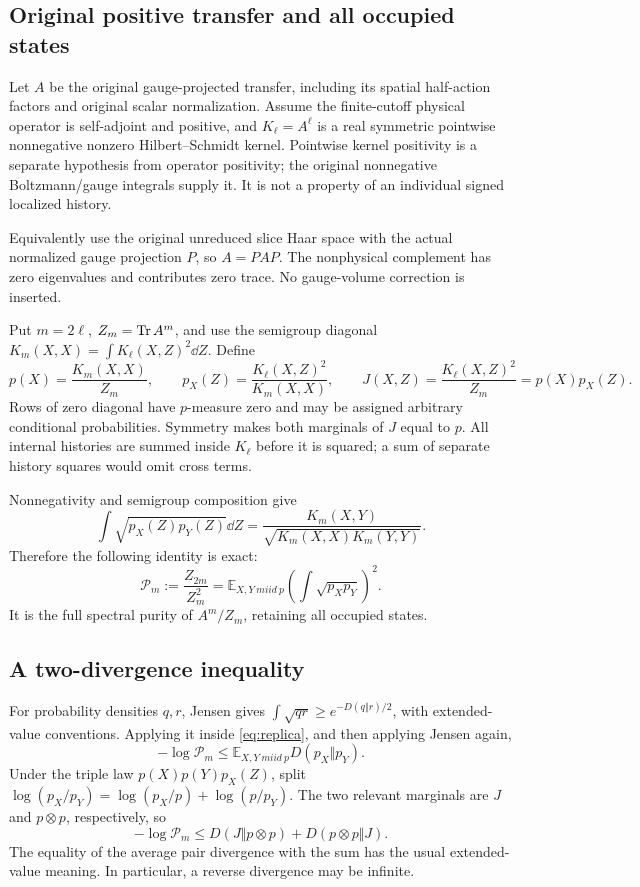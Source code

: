 \documentclass[11pt,letterpaper]{article}
\theoremstyle{remark}\newtheorem{remark}[theorem]{Remark}
\newcommand{\E}{\mathbb E}
\begin{document}
\subsection{Original positive transfer and all occupied states}

Let \(A\) be the original gauge-projected transfer, including its spatial half-action factors and original scalar normalization. Assume the finite-cutoff physical operator is self-adjoint and positive, and \(K_\ell=A^\ell\) is a real symmetric pointwise nonnegative nonzero Hilbert--Schmidt kernel. Pointwise kernel positivity is a separate hypothesis from operator positivity; the original nonnegative Boltzmann/gauge integrals supply it. It is not a property of an individual signed localized history.

Equivalently use the original unreduced slice Haar space with the actual normalized gauge projection \(P\), so \(A=PAP\). The nonphysical complement has zero eigenvalues and contributes zero trace. No gauge-volume correction is inserted.

Put \(m=2\ell\), \(Z_m=\operatorname{Tr} A^m\), and use the semigroup diagonal
\(K_m(X,X)=\int K_\ell(X,Z)^2\dd Z\). Define
\begin{equation}\label{eq:replicadefs}
 p(X)=\frac{K_m(X,X)}{Z_m},\qquad
 p_X(Z)=\frac{K_\ell(X,Z)^2}{K_m(X,X)},\qquad
 J(X,Z)=\frac{K_\ell(X,Z)^2}{Z_m}=p(X)p_X(Z).
\end{equation}
Rows of zero diagonal have \(p\)-measure zero and may be assigned arbitrary conditional probabilities. Symmetry makes both marginals of \(J\) equal to \(p\). All internal histories are summed inside \(K_\ell\) before it is squared; a sum of separate history squares would omit cross terms.

Nonnegativity and semigroup composition give
\[
 \int\sqrt{p_X(Z)p_Y(Z)}\dd Z
 =\frac{K_m(X,Y)}{\sqrt{K_m(X,X)K_m(Y,Y)}}.
\]
Therefore the following identity is exact:
\begin{equation}\label{eq:replica}
 \boxed{\quad
 \mathcal P_m:=\frac{Z_{2m}}{Z_m^2}
 =\E_{X,Y\ {
m iid}\ p}
 \left(\int\sqrt{p_Xp_Y}\right)^2.
 \quad}
\end{equation}
It is the full spectral purity of \(A^m/Z_m\), retaining all occupied states.

\subsection{A two-divergence inequality}

For probability densities \(q,r\), Jensen gives
\(\int\sqrt{qr}\ge e^{-D(q\Vert r)/2}\), with extended-value conventions. Applying it inside \eqref{eq:replica}, and then applying Jensen again,
\[
 -\log\mathcal P_m\le\E_{X,Y\ {
m iid}\ p}D(p_X\Vert p_Y).
\]
Under the triple law \(p(X)p(Y)p_X(Z)\), split
\(\log(p_X/p_Y)=\log(p_X/p)+\log(p/p_Y)\). The two relevant marginals are \(J\) and \(p\otimes p\), respectively, so
\begin{equation}\label{eq:Jeffreys}
 -\log\mathcal P_m
 \le D(J\Vert p\otimes p)+D(p\otimes p\Vert J).
\end{equation}
The equality of the average pair divergence with the sum has the usual extended-value meaning. In particular, a reverse divergence may be infinite.
\end{document}

